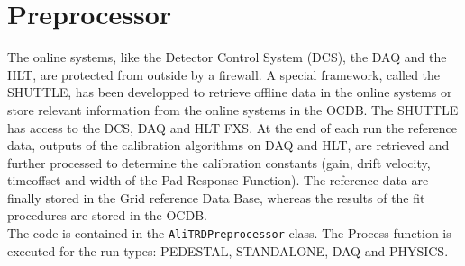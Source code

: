 \documentclass{alicetdr}
\begin{document}
\section{Preprocessor}
%
The online systems, like the Detector Control System (DCS), the DAQ 
and the HLT, are protected from outside by a firewall. A special 
framework, called the SHUTTLE, has been developped to retrieve offline 
data in the online systems or store relevant information from the 
online systems in the OCDB. The SHUTTLE has access to the DCS, DAQ 
and HLT FXS. At the end of each run the reference data, outputs of 
the calibration algorithms on DAQ and HLT, are retrieved and further 
processed to determine the calibration constants (gain, drift velocity, 
timeoffset and width of the Pad Response Function). The reference 
data are finally stored in the Grid reference Data Base, whereas the 
results of the fit procedures are stored in the OCDB.\\
The code is contained in the {\tt AliTRDPreprocessor} class. The 
Process function is executed for the run types: PEDESTAL, STANDALONE, 
DAQ and PHYSICS.
\end{document}
